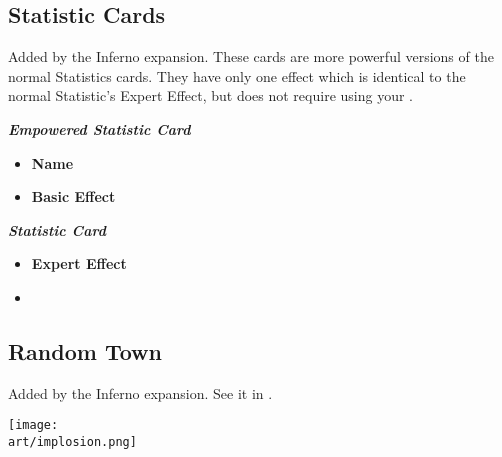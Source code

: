\begin{multicols*}{2}
\subsection*{ Statistic Cards}
Added by the Inferno expansion.
These cards are more powerful versions of the normal Statistics cards.
They have only one effect which is identical to the normal Statistic's Expert Effect, but does not require using your .

\begin{scriptsize}
\end{scriptsize}
\vspace{-2em}
\begin{multicols}{2}
  \centering
  \footnotesize{\textbf{\textit{\textcolor{darkcandyapplered}{Empowered Statistic Card}}}}
  \scriptsize
  \begin{itemize}
    \item[\textbf{1.}] \textbf{Name}
    \item[\textbf{2.}] \textbf{Basic Effect}
  \end{itemize}
  \columnbreak
  \footnotesize{\textbf{\textit{\textcolor{darkcandyapplered}{Statistic Card \phantom{Empowered}}}}}
  \scriptsize
  \begin{itemize}
    \item[\textbf{3.}] \textbf{Expert Effect}
    \item[\textbf{\phantom{.}}] \phantom{.}
  \end{itemize}
\end{multicols}

\subsection*{Random Town}
Added by the Inferno expansion. See it in .


\vfill
\hspace{2em}
\texttt{[image: \\art/implosion.png]}
\vfill

\end{multicols*}
